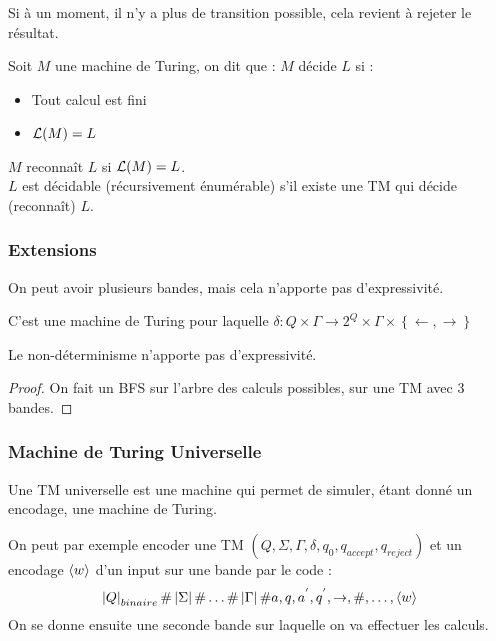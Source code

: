 \documentclass{cours}
\begin{document}
\begin{remark}
    Si à un moment, il n'y a plus de transition possible, cela revient à rejeter le résultat.
\end{remark}

\begin{definition}
    Soit $M$ une machine de Turing, on dit que : $M$ décide $L$ si :
    \begin{itemize}
        \item Tout calcul est fini
        \item $\mathcal{L}(M) = L$
    \end{itemize}
    $M$ reconnaît $L$ si $\mathcal{L}(M) = L$.\\
    $L$ est décidable (récursivement énumérable) s'il existe une TM qui décide (reconnaît) $L$.
\end{definition}

\subsubsection{Extensions}
On peut avoir plusieurs bandes, mais cela n'apporte pas d'expressivité.

\begin{definition}
    C'est une machine de Turing pour laquelle $\delta : Q \times \Gamma \rightarrow 2^{Q} \times \Gamma \times \left\{\leftarrow, \rightarrow\right\}$
\end{definition}

\begin{proposition}
    Le non-déterminisme n'apporte pas d'expressivité.
\end{proposition}
\begin{proof}
    On fait un BFS sur l'arbre des calculs possibles, sur une TM avec 3 bandes.
\end{proof}


\subsubsection{Machine de Turing Universelle}
\begin{definition}
    Une TM universelle est une machine qui permet de simuler, étant donné un encodage, une machine de Turing.    
\end{definition}

On peut par exemple encoder une TM $(Q, \Sigma, \Gamma, \delta, q_{0}, q_{accept}, q_{reject})$ et un encodage $\left\langle w \right\rangle$ d'un input sur une bande par le code :
\[
    \left|Q\right|_{binaire} \# \left|\Sigma\right| \# \ldots \# \left|\Gamma\right| \# a, q, a^{'}, q^{'}, \rightarrow, \#, \ldots, \left\langle w \right\rangle
\]
On se donne ensuite une seconde bande sur laquelle on va effectuer les calculs.
\end{document}
